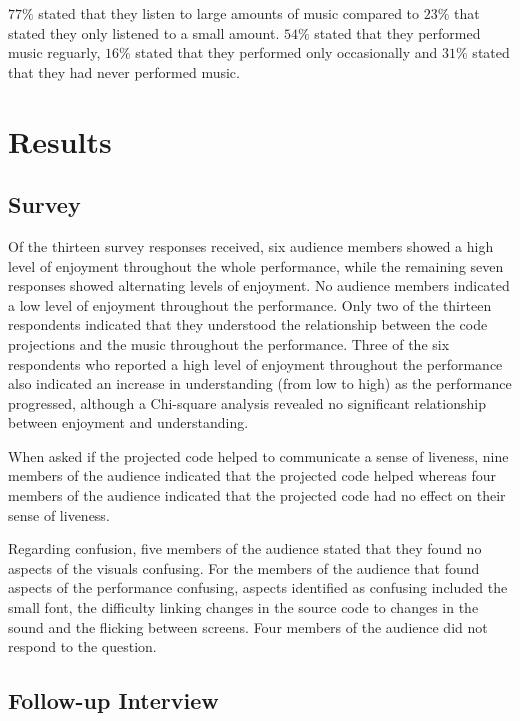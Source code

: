 $77\%$ stated that they listen to large amounts of music compared to $23\%$ that stated they only listened to a small amount. $54\%$ stated that they performed music reguarly, $16\%$ stated that they performed only occasionally and $31\%$ stated that they had never performed music.

\section{Results}

\subsection{Survey}

Of the thirteen survey responses received, six audience members showed a high level of enjoyment throughout the whole performance, while the remaining seven responses showed alternating levels of enjoyment. No audience members indicated a low level of enjoyment throughout the performance.  Only two of the thirteen respondents indicated that they understood the relationship between the code projections and the music throughout the performance. Three of the six respondents who reported a high level of enjoyment throughout the performance also indicated an increase in understanding (from low to high) as the performance progressed, although a Chi-square analysis revealed no significant relationship between enjoyment and understanding. 

When asked if the projected code helped to communicate a sense of liveness, nine members of the audience indicated that the projected code helped whereas four members of the audience indicated that the projected code had no effect on their sense of liveness.

Regarding confusion, five members of the audience stated that they found no aspects of the visuals confusing. For the members of the audience that found aspects of the performance confusing, aspects identified as confusing included the small font, the difficulty linking changes in the source code to changes in the sound and the flicking between screens. Four members of the audience did not respond to the question.

\subsection{Follow-up Interview}
\label{section:study-1-follow-up-interview}

